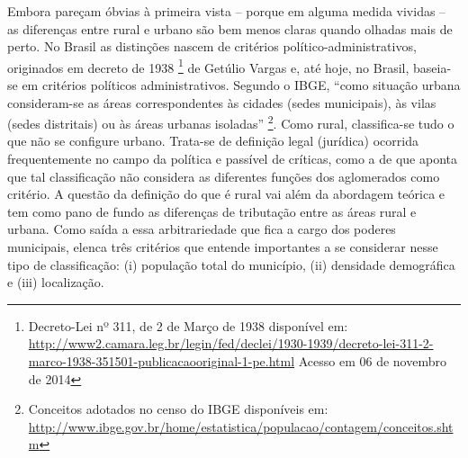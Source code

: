 Embora pareçam óbvias à primeira vista – porque em alguma medida vividas – as diferenças entre rural e urbano são bem menos claras quando olhadas mais de perto. No Brasil as distinções nascem de critérios político-administrativos, originados em decreto de 1938
\footnote{Decreto-Lei nº 311, de 2 de Março de 1938 disponível em: \url{http://www2.camara.leg.br/legin/fed/declei/1930-1939/decreto-lei-311-2-marco-1938-351501-publicacaooriginal-1-pe.html} Acesso em 06 de novembro de 2014}
de Getúlio Vargas e, até hoje, no Brasil, baseia-se em critérios políticos administrativos. Segundo o IBGE, ``como situação urbana consideram-se as áreas correspondentes às cidades (sedes municipais), às vilas (sedes distritais) ou às áreas urbanas isoladas''
\footnote{Conceitos adotados no censo do IBGE disponíveis em: \url{http://www.ibge.gov.br/home/estatistica/populacao/contagem/conceitos.shtm}}. Como rural, classifica-se tudo o que não se configure urbano. Trata-se de definição legal (jurídica) ocorrida frequentemente no campo da política e passível de críticas, como a de \cite{GRABOIS2001} que aponta que tal classificação não considera as diferentes funções dos aglomerados como critério. A questão da definição do que é rural vai além da abordagem teórica e tem como pano de fundo as diferenças de tributação entre as áreas rural e urbana. Como saída a essa arbitrariedade que fica a cargo dos poderes municipais, \cite{VEIGA2002} elenca três critérios que entende importantes a se considerar nesse tipo de classificação: (i) população total do município, (ii) densidade demográfica e (iii) localização.

